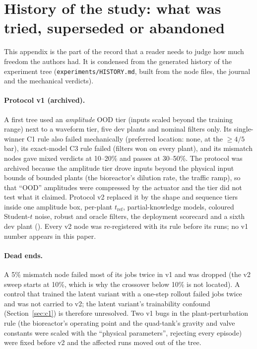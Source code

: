 \section{History of the study: what was tried, superseded or abandoned}\label{app:history}

This appendix is the part of the record that a reader needs to judge how much freedom the authors had. It is condensed from the generated history of the experiment tree (\texttt{experiments/HISTORY.md}, built from the node files, the journal and the mechanical verdicts).

\paragraph{Protocol v1 (archived).} A first tree used an \emph{amplitude} OOD tier (inputs scaled beyond the training range) next to a waveform tier, five dev plants and nominal filters only. Its single-winner C1 rule also failed mechanically (preferred location: none, at the $\ge4/5$ bar), its exact-model C3 rule failed (filters won on every plant), and its mismatch nodes gave mixed verdicts at 10--20\% and passes at 30--50\%. The protocol was archived because the amplitude tier drove inputs beyond the physical input bounds of bounded plants (the bioreactor's dilution rate, the traffic ramp), so that ``OOD'' amplitudes were compressed by the actuator and the tier did not test what it claimed. Protocol v2 replaced it by the shape and sequence tiers inside one amplitude box, per-plant $t_\mathrm{ref}$, partial-knowledge models, coloured Student-$t$ noise, robust and oracle filters, the deployment scorecard and a sixth dev plant (). Every v2 node was re-registered with its rule before its runs; no v1 number appears in this paper.

\paragraph{Dead ends.} A 5\% mismatch node failed most of its jobs twice in v1 and was dropped (the v2 sweep starts at 10\%, which is why the crossover below 10\% is not located). A control that trained the latent variant with a one-step rollout failed jobs twice and was not carried to v2; the latent variant's trainability confound (Section~\ref{sec:c1}) is therefore unresolved. Two v1 bugs in the plant-perturbation rule (the bioreactor's operating point and the quad-tank's gravity and valve constants were scaled with the ``physical parameters'', rejecting every episode) were fixed before v2 and the affected runs moved out of the tree.

